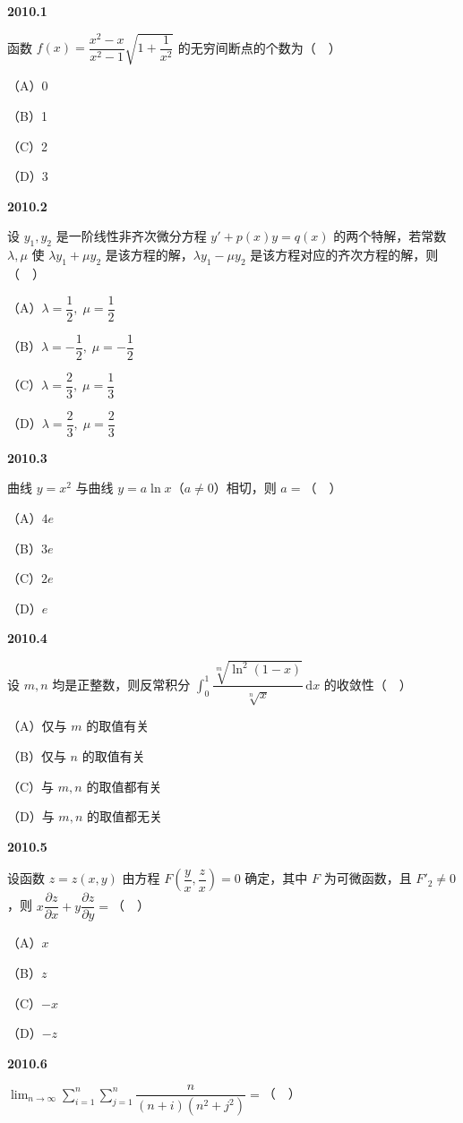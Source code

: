 \documentclass[UTF8,12pt,fontset=windows]{ctexart}
\begin{document}
{\large\bfseries 2010.1}

函数 $f(x) = \dfrac{x^2 - x}{x^2 - 1}\sqrt{1 + \dfrac{1}{x^2}}$ 的无穷间断点的个数为（　）

（A）0

（B）1

（C）2

（D）3

\vfill
\newpage
{\large\bfseries 2010.2}

设 $y_1, y_2$ 是一阶线性非齐次微分方程 $y' + p(x)y = q(x)$ 的两个特解，若常数 $\lambda, \mu$ 使 $\lambda y_1 + \mu y_2$ 是该方程的解，$\lambda y_1 - \mu y_2$ 是该方程对应的齐次方程的解，则（　）

（A）$\lambda = \dfrac{1}{2}, \; \mu = \dfrac{1}{2}$

（B）$\lambda = -\dfrac{1}{2}, \; \mu = -\dfrac{1}{2}$

（C）$\lambda = \dfrac{2}{3}, \; \mu = \dfrac{1}{3}$

（D）$\lambda = \dfrac{2}{3}, \; \mu = \dfrac{2}{3}$

\vfill
\newpage
{\large\bfseries 2010.3}

曲线 $y = x^2$ 与曲线 $y = a \ln x$（$a \neq 0$）相切，则 $a =$（　）

（A）$4e$

（B）$3e$

（C）$2e$

（D）$e$

\vfill
\newpage
{\large\bfseries 2010.4}

设 $m, n$ 均是正整数，则反常积分 $\int_0^1 \dfrac{\sqrt[m]{\ln^2(1-x)}}{\sqrt[n]{x}} \,\mathrm{d}x$ 的收敛性（　）

（A）仅与 $m$ 的取值有关

（B）仅与 $n$ 的取值有关

（C）与 $m, n$ 的取值都有关

（D）与 $m, n$ 的取值都无关

\vfill
\newpage
{\large\bfseries 2010.5}

设函数 $z = z(x, y)$ 由方程 $F\left(\dfrac{y}{x}, \dfrac{z}{x}\right) = 0$ 确定，其中 $F$ 为可微函数，且 $F'_2 \neq 0$，则 $x\dfrac{\partial z}{\partial x} + y\dfrac{\partial z}{\partial y} =$（　）

（A）$x$

（B）$z$

（C）$-x$

（D）$-z$

\vfill
\newpage
{\large\bfseries 2010.6}

$\lim_{n \to \infty} \sum_{i=1}^n \sum_{j=1}^n \dfrac{n}{(n+i)(n^2 + j^2)} =$（　）
\end{document}
